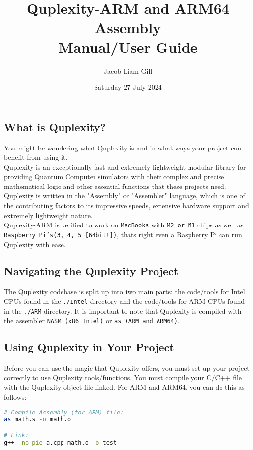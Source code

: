 \documentclass{article}
\title{Quplexity-ARM and ARM64 Assembly \\ Manual/User Guide}
\author{Jacob Liam Gill}
\date{Saturday 27 July 2024}
\begin{document}
\maketitle

\subsection*{What is Quplexity?}
You might be wondering what Quplexity is and in what ways your project can benefit from using it. \\
Quplexity is an exceptionally fast and extremely lightweight modular library for providing Quantum Computer simulators with their complex and precise mathematical logic and other essential functions that these projects need.
Quplexity is written in the "Assembly" or "Assembler" language, which is one of the contributing factors to its impressive speeds, extensive hardware support and extremely lightweight nature. \\

\noindent Quplexity-ARM is verified to work on \texttt{MacBooks} with \texttt{M2 or M1} chips as well as \texttt{Raspberry Pi's(3, 4, 5 [64bit!])}, thats right even a Raspberry Pi can run Quplexity with ease.

\subsection*{Navigating the Quplexity Project}
The Quplexity codebase is split up into two main parts: the code/tools for Intel CPUs found in the \texttt{./Intel} directory and the code/tools for ARM CPUs found in the \texttt{./ARM} directory. It is important to note that Quplexity is compiled with the assembler \texttt{NASM (x86 Intel)} or \texttt{as (ARM and ARM64)}.

\subsection*{Using Quplexity in Your Project}
Before you can use the magic that Quplexity offers, you must set up your project correctly to use Quplexity tools/functions. You must compile your C/C++ file with the Quplexity object file linked. For ARM and ARM64, you can do this as follows: \\

\begin{lstlisting}[language=bash, frame=single]
# Compile Assembly (for ARM) file:
as math.s -o math.o

# Link:
g++ -no-pie a.cpp math.o -o test
\end{lstlisting}
\end{document}
